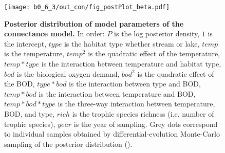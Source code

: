\documentclass[11pt, oneside]{article}
\begin{document}
\begin{figure}[H]
\begin{center}
\texttt{[image: b0\_6\_3/out\_con/fig\_postPlot\_beta.pdf]}
\caption{
    \textbf{Posterior distribution of model parameters of the connectance model.}
    In order: $P$ is the log posterior density, $1$ is the intercept, $type$ is the habitat type whether stream or lake, $temp$ is the temperature, $temp^2$ is the quadratic effect of the temperature, $temp * type$ is the interaction between temperature and habitat type, $bod$ is the biological oxygen demand, $bod^2$ is the quadratic effect of the BOD, $type * bod$ is the interaction between type and BOD, $temp * bod$ is the interaction between temperature and BOD, $temp * bod * type$ is the three-way interaction between temperature, BOD, and type, $rich$ is the trophic species richness (i.e. number of trophic species), $year$ is the year of sampling.
    Grey dots correspond to individual samples obtained by differential-evolution Monte-Carlo sampling of the posterior distribution (\cite{TerBraak2006}). 
} 
\end{center}
\end{figure}
\end{document}
